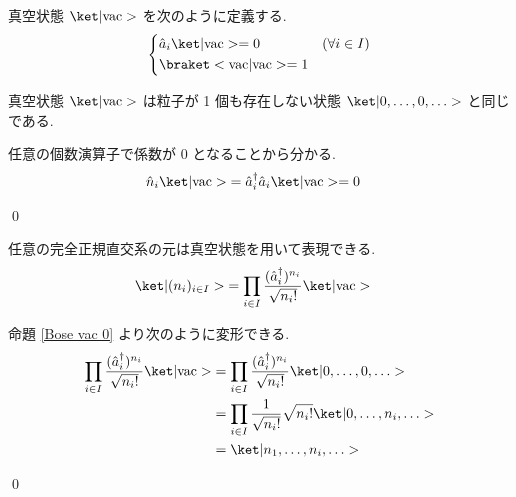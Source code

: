 \documentclass[uplatex,dvipdfmx,a4paper,11pt]{jlreq}
\makeatletter
\numberwithin{equation}{section}
\theoremstyle{definition}
\renewenvironment{proof}[1][\proofname]{\par
  \normalfont
  \topsep6\p@\@plus6\p@ \trivlist
  \item[\hskip\labelsep{\bfseries #1}\@addpunct{\bfseries}]\ignorespaces\quad\par
}{
  \qed\endtrivlist\@endpefalse
}
\renewcommand\proofname{証明}
\makeatother
\begin{document}
\begin{definition}
  真空状態 $\ket|\mathrm{vac}>$ を次のように定義する.
  \begin{align}
    \begin{dcases}
      \hat{a}_i\ket|\mathrm{vac}> = 0 & (\forall i\in I) \\
      \braket<\mathrm{vac}|\mathrm{vac}> = 1
    \end{dcases}
  \end{align}
\end{definition}
\begin{proposition}[Q21-40(i)]
  真空状態 $\ket|\mathrm{vac}>$ は粒子が 1 個も存在しない状態 $\ket|0,\ldots,0,\ldots>$ と同じである.
  \label{Bose vac 0}
\end{proposition}
\begin{proof}
  任意の個数演算子で係数が $0$ となることから分かる.
  \begin{align}
    \hat{n}_i\ket|\mathrm{vac}> & = \hat{a}_i^\dagger\hat{a}_i\ket|\mathrm{vac}> = 0
  \end{align}
\end{proof}

\begin{proposition}[Q21-40(ii)]
  任意の完全正規直交系の元は真空状態を用いて表現できる.
  \begin{align}
    \ket|(n_i)_{i\in I}> & = \prod_{i\in I}\frac{(\hat{a}_i^\dagger)^{n_i}}{\sqrt{n_i!}}\ket|\mathrm{vac}>
  \end{align}
\end{proposition}
\begin{proof}
  命題 \ref{Bose vac 0} より次のように変形できる.
  \begin{align}
    \prod_{i\in I}\frac{(\hat{a}_i^\dagger)^{n_i}}{\sqrt{n_i!}}\ket|\mathrm{vac}> & = \prod_{i\in I}\frac{(\hat{a}_i^\dagger)^{n_i}}{\sqrt{n_i!}}\ket|0,\ldots,0,\ldots> \\
                                                                                  & = \prod_{i\in I}\frac{1}{\sqrt{n_i!}}\sqrt{n_i!}\ket|0,\ldots,n_i,\ldots>            \\
                                                                                  & = \ket|n_1,\ldots,n_i,\ldots>
  \end{align}
\end{proof}
\end{document}
